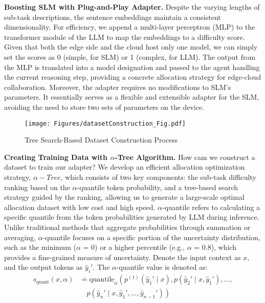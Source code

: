 \textbf{Boosting SLM with Plug-and-Play Adapter.}
Despite the varying lengths of sub-task descriptions, the sentence embeddings maintain a consistent dimensionality. For efficiency, we append a multi-layer perceptron (MLP) to the transformer module of the LLM to map the embeddings to a difficulty score. Given that both the edge side and the cloud host only one model, we can simply set the scores as 0 (simple, for SLM) or 1 (complex, for LLM). The output from the MLP is translated into a model designation and passed to the agent handling the current reasoning step, providing a concrete allocation strategy for edge-cloud collaboration. 
Moreover, the adapter requires no modifications to SLM's parameters. It essentially serves as a flexible and extensible adapter for the SLM, avoiding the need to store two sets of parameters on the device.

\begin{figure}
    \centering
    \texttt{[image: Figures/datasetConstruction\_Fig.pdf]}
    \vspace{-6mm}
    \caption{Tree Search-Based Dataset Construction Process}
    \label{method:dataConstruction}
    \vspace{-4mm}
\end{figure}


\textbf{Creating Training Data with \textbf{$\alpha$}-Tree Algorithm.}
How cam we construct a dataset to train our adapter?
We develop an efficient allocation optimization strategy, $\alpha-Tree$,  which consists of two key components: the sub-task difficulty ranking based on the $\alpha$-quantile token probability, and a tree-based search strategy guided by the ranking, allowing us to generate a large-scale optimal allocation dataset with low cost and high speed.
$\alpha$-quantile refers to calculating a specific quantile from the token probabilities generated by LLM during inference. Unlike traditional methods that aggregate probabilities through summation or averaging, $\alpha$-quantile focuses on a specific portion of the uncertainty distribution, such as the minimum ($\alpha$ = 0) or a higher percentile (e.g., $\alpha$ = 0.8), which provides a fine-grained measure of uncertainty.
Denote the input context as $x$, and the output tokens as $\hat{y}_i'$. The $\alpha$-quantile value is denoted as:
\begin{equation}
\begin{aligned}
s_{\text{quant}}(x, \alpha) &\doteq \text{quantile}_{\alpha}\left(p^{(1)}(\hat{y}_1' \mid x), \right.  p(\hat{y}_2' \mid x, \hat{y}_1'), \dots, \\
& \left. \quad p(\hat{y}_n' \mid x, \hat{y}_1', \dots, \hat{y}_{n-1}')\right)
\end{aligned}
\end{equation}

